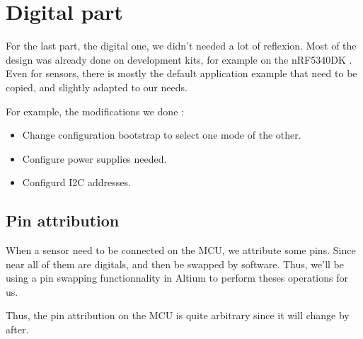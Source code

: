 \section{Digital part}
For the last part, the digital one, we didn't needed a lot of reflexion. Most of
the design was already done on development kits, for example on the nRF5340DK
\cite{nRF5340DK}. Even for sensors, there is mostly the default
application example that need to be copied, and slightly adapted to our needs.

For example, the modifications we done :
\begin{itemize}
    \item   Change configuration bootstrap to select one mode of the other.
    \item   Configure power supplies needed.
    \item   Configurd I2C addresses.
\end{itemize}

\subsection{Pin attribution}
When a sensor need to be connected on the MCU, we attribute some pins. Since near
all of them are digitals, and then be swapped by software. Thus, we'll be using a
pin swapping functionnality in Altium to perform theses operations for us.

Thus, the pin attribution on the MCU is quite arbitrary since it will change by after.